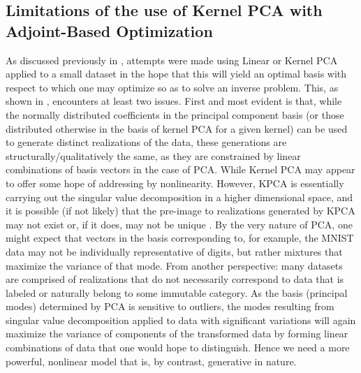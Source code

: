 \documentclass{article}
\begin{document}
\subsection{Limitations of the use of Kernel PCA with Adjoint-Based Optimization }\label{limkpca}
	As discussed previously in \label{intokpca}, attempts were made using Linear or Kernel PCA applied to a small dataset in the hope that this will yield an optimal basis with respect to which one may optimize so as to solve an inverse problem.  This, as shown in \label{KDEPCA}, encounters at least two issues.  First and most evident is that, while the normally distributed coefficients in the principal component basis (or those distributed otherwise in the basis of kernel PCA for a given kernel) can be used to generate distinct realizations of the data, these generations are structurally/qualitatively the same, as they are constrained by linear combinations of basis vectors in the case of PCA.  While Kernel PCA may appear to offer some hope of addressing by nonlinearity.  However, KPCA is essentially carrying out the singular value decomposition in a higher dimensional space, and it is possible (if not likely) that the pre-image to realizations generated by KPCA may not exist or, if it does, may not be unique \cite{Scholkopf1997KernelAnalysis}.  By the very nature of PCA, one might expect that vectors in the basis corresponding to, for example, the MNIST data may not be individually representative of digits, but rather mixtures that maximize the variance of that mode.  From another perspective: many datasets are comprised of realizations that do not necessarily correspond to data that is labeled or naturally belong to some immutable category. As the basis (principal modes) determined by PCA is sensitive to outliers, the modes resulting from singular value decomposition applied to data with significant variations will again maximize the variance of components of the transformed data by forming linear combinations of data that one would hope to distinguish. Hence we need a more powerful, nonlinear model that is, by contrast, generative in nature. 
%
%
%

    
\end{document}
